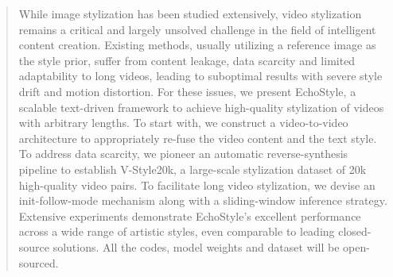 \documentclass[runningheads]{llncs}
\begin{document}
\begin{abstract}
While image stylization has been studied extensively, video stylization remains a critical and largely unsolved challenge in the field of intelligent content creation. Existing methods, usually utilizing a reference image as the style prior, suffer from content leakage, data scarcity and limited adaptability to long videos, leading to suboptimal results with severe style drift and motion distortion. For these issues, we present EchoStyle, a scalable text-driven framework to achieve high-quality stylization of videos with arbitrary lengths. To start with, we construct a video-to-video architecture to appropriately re-fuse the video content and the text style. To address data scarcity, we pioneer an automatic reverse-synthesis pipeline to establish V-Style20k, a large-scale stylization dataset of 20k high-quality video pairs. To facilitate long video stylization, we devise an init-follow-mode mechanism along with a sliding-window inference strategy. Extensive experiments demonstrate EchoStyle's excellent performance across a wide range of artistic styles, even comparable to leading closed-source solutions. All the codes, model weights and dataset will be open-sourced.


\end{abstract}
\end{document}
